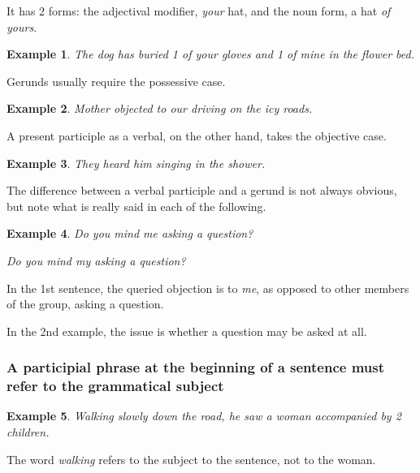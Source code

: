 \documentclass{article}
\newtheorem{example}{Example}
\begin{document}
It has 2 forms: the adjectival modifier, {\it your} hat, and the noun form, a hat {\it of yours}.
\begin{example}
	The dog has buried 1 of your gloves and 1 of mine in the flower bed.
\end{example}
Gerunds usually require the possessive case.
\begin{example}
	Mother objected to our driving on the icy roads.
\end{example}
A present participle as a verbal, on the other hand, takes the objective case.
\begin{example}
	They heard him singing in the shower.
\end{example}
The difference between a verbal participle and a gerund is not always obvious, but note what is really said in each of the following.
\begin{example}
	Do you mind me asking a question?
	
	Do you mind my asking a question?
\end{example}
In the 1st sentence, the queried objection is to {\it me}, as opposed to other members of the group, asking a question.

In the 2nd example, the issue is whether a question may be asked at all.


\subsubsection{A participial phrase at the beginning of a sentence must refer to the grammatical subject}
\begin{example}
	Walking slowly down the road, he saw a woman accompanied by 2 children.
\end{example}
The word {\it walking} refers to the subject to the sentence, not to the woman.
\end{document}
